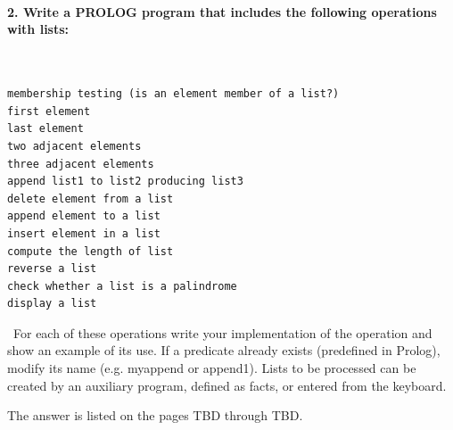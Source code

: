\documentclass{article}
\begin{document}
	
\paragraph{}\

	
	
	\rmfamily
	
	\paragraph{2. Write a PROLOG program that includes the following operations with lists: }\
	
	\ttfamily
	
	\begin{lstlisting}
membership testing (is an element member of a list?)
first element
last element
two adjacent elements
three adjacent elements
append list1 to list2 producing list3
delete element from a list
append element to a list
insert element in a list
compute the length of list
reverse a list
check whether a list is a palindrome
display a list
	\end{lstlisting}
	
	\rmfamily\
	For each of these operations write your implementation of the operation and show an example of its use. If a predicate already exists (predefined in Prolog), modify its name (e.g. myappend or append1).
	Lists to be processed can be created by an auxiliary program, defined as facts, or entered from the keyboard.
	\newline
	
	The answer is listed on the pages TBD through TBD.
	
	
\paragraph{}\
\paragraph{}\
\paragraph{}\
\paragraph{}\
\paragraph{}\
\paragraph{}\
\end{document}
